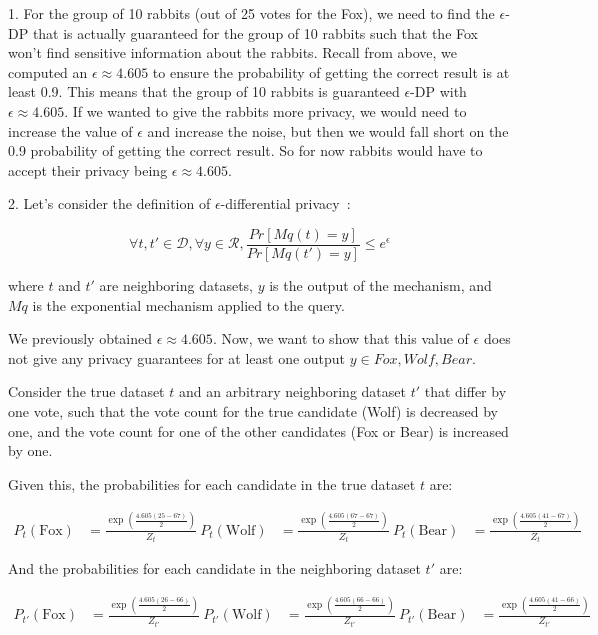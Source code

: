 1. For the group of 10 rabbits (out of 25 votes for the Fox), we need to find the $\epsilon$-DP that is actually guaranteed for the group of
10 rabbits such that the Fox won't find sensitive information about the rabbits.
Recall from above, we computed an $\epsilon \approx 4.605$ to ensure the
probability of getting the correct result is at least 0.9.
This means that the group of 10 rabbits is
guaranteed $\epsilon$-DP with $\epsilon \approx 4.605$.
If we wanted to give the rabbits more privacy, we would need to increase the value of $\epsilon$ and increase the noise, but
then we would fall short on the 0.9 probability of getting the correct result.
So for now rabbits would have to accept their privacy being $\epsilon \approx 4.605$.

2. Let's consider the definition of $\epsilon$-differential privacy~\cite[3]{10007322}:

\begin{equation}
  \forall t, t' \in \mathcal{D}, \forall y \in \mathcal{R}, \frac{Pr[Mq(t) = y]}{Pr[Mq(t') = y]} \leq e^\epsilon
\end{equation}

where $t$ and $t'$ are neighboring datasets, $y$ is the output of the mechanism, and $Mq$ is the exponential mechanism applied to the query.

We previously obtained $\epsilon \approx 4.605$. Now, we want to show that this value of $\epsilon$ does not give any privacy guarantees for at least one output $y \in {Fox, Wolf, Bear}$.

Consider the true dataset $t$ and an arbitrary neighboring dataset $t'$ that differ by one vote, such that the vote count for the true candidate (Wolf) is decreased by one, and the vote count for one of the other candidates (Fox or Bear) is increased by one.

Given this, the probabilities for each candidate in the true dataset $t$ are:

\begin{align*}
  P_t(\text{Fox}) &= \frac{\exp\left(\frac{4.605(25 - 67)}{2}\right)}{Z_t} \
  P_t(\text{Wolf}) &= \frac{\exp\left(\frac{4.605(67 - 67)}{2}\right)}{Z_t} \
  P_t(\text{Bear}) &= \frac{\exp\left(\frac{4.605(41 - 67)}{2}\right)}{Z_t}
\end{align*}

And the probabilities for each candidate in the neighboring dataset $t'$ are:

\begin{align*}
  P_{t'}(\text{Fox}) &= \frac{\exp\left(\frac{4.605(26 - 66)}{2}\right)}{Z_{t'}} \
  P_{t'}(\text{Wolf}) &= \frac{\exp\left(\frac{4.605(66 - 66)}{2}\right)}{Z_{t'}} \
  P_{t'}(\text{Bear}) &= \frac{\exp\left(\frac{4.605(41 - 66)}{2}\right)}{Z_{t'}}
\end{align*}

